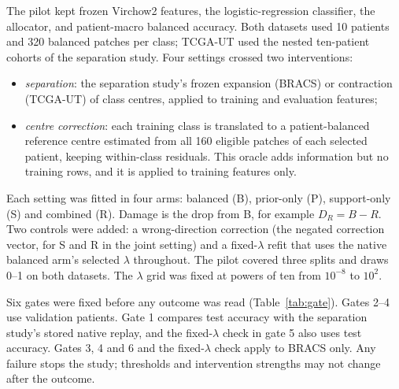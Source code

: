 \documentclass[11pt]{article}
\begin{document}
The pilot kept frozen Virchow2 features, the logistic-regression classifier, the allocator, and patient-macro balanced accuracy. Both datasets used 10 patients and 320 balanced patches per class; TCGA-UT used the nested ten-patient cohorts of the separation study. Four settings crossed two interventions:
\begin{itemize}
  \item \emph{separation}: the separation study's frozen expansion (BRACS) or contraction (TCGA-UT) of class centres, applied to training and evaluation features;
  \item \emph{centre correction}: each training class is translated to a patient-balanced reference centre estimated from all 160 eligible patches of each selected patient, keeping within-class residuals. This oracle adds information but no training rows, and it is applied to training features only.
\end{itemize}
Each setting was fitted in four arms: balanced (B), prior-only (P), support-only (S) and combined (R). Damage is the drop from B, for example $D_R = B - R$. Two controls were added: a wrong-direction correction (the negated correction vector, for S and R in the joint setting) and a fixed-$\lambda$ refit that uses the native balanced arm's selected $\lambda$ throughout. The pilot covered three splits and draws 0--1 on both datasets. The $\lambda$ grid was fixed at powers of ten from $10^{-8}$ to $10^{2}$.

Six gates were fixed before any outcome was read (Table~\ref{tab:gate}). Gates 2--4 use validation patients. Gate 1 compares test accuracy with the separation study's stored native replay, and the fixed-$\lambda$ check in gate 5 also uses test accuracy. Gates 3, 4 and 6 and the fixed-$\lambda$ check apply to BRACS only. Any failure stops the study; thresholds and intervention strengths may not change after the outcome.
\end{document}
